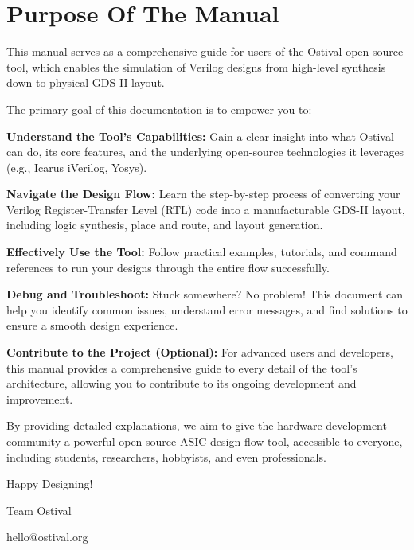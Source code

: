 \chapter*{Purpose Of The Manual}

This manual serves as a comprehensive guide for users of the Ostival open-source tool, which enables the simulation of Verilog designs from high-level synthesis down to physical GDS-II layout. 

The primary goal of this documentation is to empower you to:

\textbf{Understand the Tool's Capabilities:} Gain a clear insight into what Ostival can do, its core features, and the underlying open-source technologies it leverages (e.g., Icarus iVerilog, Yosys).

\textbf{Navigate the Design Flow:} Learn the step-by-step process of converting your Verilog Register-Transfer Level (RTL) code into a manufacturable GDS-II layout, including logic synthesis, place and route, and layout generation.

\textbf{Effectively Use the Tool:} Follow practical examples, tutorials, and command references to run your designs through the entire flow successfully.

\textbf{Debug and Troubleshoot:} Stuck somewhere? No problem! This document can help you identify common issues, understand error messages, and find solutions to ensure a smooth design experience.

\textbf{Contribute to the Project (Optional):} For advanced users and developers, this manual provides a comprehensive guide to every detail of the tool's architecture, allowing you to contribute to its ongoing development and improvement.

By providing detailed explanations, we aim to give the hardware development community a powerful open-source ASIC design flow tool, accessible to everyone, including students, researchers, hobbyists, and even professionals.


\vfill

Happy Designing!

Team Ostival

hello@ostival.org